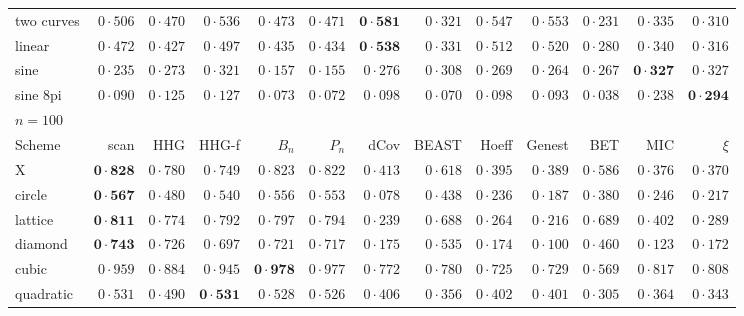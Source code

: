 \begin{table}
{\begin{tabular}{lrrrrrrrrrrrr}
two curves & $0{\cdot}506$ & $0{\cdot}470$ & $0{\cdot}536$ & $0{\cdot}473$ & $0{\cdot}471$ & $\mathbf{0{\cdot}581}$ & $0{\cdot}321$ & $0{\cdot}547$ & $0{\cdot}553$ & $0{\cdot}231$ & $0{\cdot}335$ & $0{\cdot}310$ \\
linear & $0{\cdot}472$ & $0{\cdot}427$ & $0{\cdot}497$ & $0{\cdot}435$ & $0{\cdot}434$ & $\mathbf{0{\cdot}538}$ & $0{\cdot}331$ & $0{\cdot}512$ & $0{\cdot}520$ & $0{\cdot}280$ & $0{\cdot}340$ & $0{\cdot}316$ \\
sine & $0{\cdot}235$ & $0{\cdot}273$ & $0{\cdot}321$ & $0{\cdot}157$ & $0{\cdot}155$ & $0{\cdot}276$ & $0{\cdot}308$ & $0{\cdot}269$ & $0{\cdot}264$ & $0{\cdot}267$ & $\mathbf{0{\cdot}327}$ & $0{\cdot}327$ \\
sine 8pi & $0{\cdot}090$ & $0{\cdot}125$ & $0{\cdot}127$ & $0{\cdot}073$ & $0{\cdot}072$ & $0{\cdot}098$ & $0{\cdot}070$ & $0{\cdot}098$ & $0{\cdot}093$ & $0{\cdot}038$ & $0{\cdot}238$ & $\mathbf{0{\cdot}294}$ \\
\hline
\multicolumn{13}{l}{$n = 100$} \\
Scheme & scan & HHG & HHG-f & $B_n$ & $P_n$ & dCov & BEAST & Hoeff & Genest & BET & MIC & $\xi$ \\ \hline
X & $\mathbf{0{\cdot}828}$ & $0{\cdot}780$ & $0{\cdot}749$ & $0{\cdot}823$ & $0{\cdot}822$ & $0{\cdot}413$ & $0{\cdot}618$ & $0{\cdot}395$ & $0{\cdot}389$ & $0{\cdot}586$ & $0{\cdot}376$ & $0{\cdot}370$ \\
circle & $\mathbf{0{\cdot}567}$ & $0{\cdot}480$ & $0{\cdot}540$ & $0{\cdot}556$ & $0{\cdot}553$ & $0{\cdot}078$ & $0{\cdot}438$ & $0{\cdot}236$ & $0{\cdot}187$ & $0{\cdot}380$ & $0{\cdot}246$ & $0{\cdot}217$ \\
lattice & $\mathbf{0{\cdot}811}$ & $0{\cdot}774$ & $0{\cdot}792$ & $0{\cdot}797$ & $0{\cdot}794$ & $0{\cdot}239$ & $0{\cdot}688$ & $0{\cdot}264$ & $0{\cdot}216$ & $0{\cdot}689$ & $0{\cdot}402$ & $0{\cdot}289$ \\
diamond & $\mathbf{0{\cdot}743}$ & $0{\cdot}726$ & $0{\cdot}697$ & $0{\cdot}721$ & $0{\cdot}717$ & $0{\cdot}175$ & $0{\cdot}535$ & $0{\cdot}174$ & $0{\cdot}100$ & $0{\cdot}460$ & $0{\cdot}123$ & $0{\cdot}172$ \\
cubic & $0{\cdot}959$ & $0{\cdot}884$ & $0{\cdot}945$ & $\mathbf{0{\cdot}978}$ & $0{\cdot}977$ & $0{\cdot}772$ & $0{\cdot}780$ & $0{\cdot}725$ & $0{\cdot}729$ & $0{\cdot}569$ & $0{\cdot}817$ & $0{\cdot}808$ \\
quadratic & $0{\cdot}531$ & $0{\cdot}490$ & $\mathbf{0{\cdot}531}$ & $0{\cdot}528$ & $0{\cdot}526$ & $0{\cdot}406$ & $0{\cdot}356$ & $0{\cdot}402$ & $0{\cdot}401$ & $0{\cdot}305$ & $0{\cdot}364$ & $0{\cdot}343$ \\

\end{tabular}}
\end{table}
